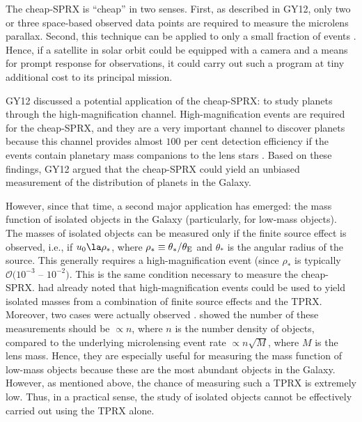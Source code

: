 \documentclass[10pt]{emulateapj}
\begin{document}
 The cheap-SPRX is ``cheap'' in two senses. First, as described in GY12, only two or three space-based 
observed data points are required to measure the microlens parallax. Second, this technique can be applied 
to only a small fraction of events \citep[the total number of high-magnification events is inversely proportional 
to the peak magnification;][]{gould10b}. Hence, if a satellite in solar orbit could be equipped with a camera and a means for 
prompt response for observations, it could carry out such a program at tiny additional cost to its principal mission.

 GY12 discussed a potential application of the cheap-SPRX: to study planets through the high-magnification 
channel. High-magnification events are required for the cheap-SPRX, and they are a very important channel 
to discover planets because this channel provides almost $100$ per cent detection efficiency if the events 
contain planetary mass companions to the lens stars \citep{griest98}. Based on these findings, GY12 argued 
that the cheap-SPRX could yield an unbiased measurement of the distribution of planets in the Galaxy.

 However, since that time, a second major application has emerged: the mass function of isolated objects 
in the Galaxy (particularly, for low-mass objects). The masses of isolated objects can be measured only 
if the finite source effect is observed, i.e., if $u_0 \la \rho_{\ast}$, where 
$\rho_{\ast}\equiv\theta_{\ast}/ \theta_{\rm E}$ and $\theta_{\ast}$ is the angular radius of the source. 
This generally requires a high-magnification event (since $\rho_{\ast}$ is typically 
$\mathcal{O}(10^{-3}$ -- $10^{-2})$. This is the same condition necessary to measure the cheap-SPRX. 
\citet{gould97} had already noted that high-magnification events could be used to yield isolated masses 
from a combination of finite source effects and the TPRX. Moreover, two cases were actually observed 
\citep{gould09,yee09}. \citet{gould13} showed the number of these measurements should be $\propto n$, 
where $n$ is the number density of objects, compared to the underlying microlensing event rate 
$\propto n\sqrt{M}$, where $M$ is the lens mass. Hence, they are especially useful for measuring the mass 
function of low-mass objects because these are the most abundant objects in the Galaxy. However, 
as mentioned above, the chance of measuring such a TPRX is extremely low. Thus, in a practical sense, 
the study of isolated objects cannot be effectively carried out using the TPRX alone.
\end{document}
